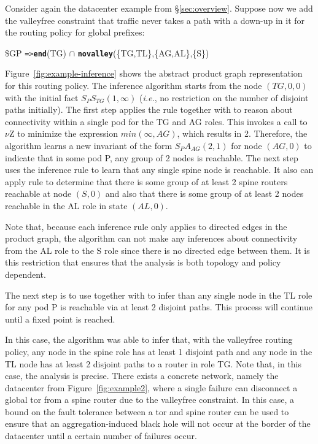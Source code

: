 \documentclass[numbers, 10pt, preprint]{sigplanconf}
\newcommand{\IE}{\emph{i.e.}}
\newcommand{\KW}[1]{\texttt{\small\bfseries{#1}}}
\newcommand{\Path}{\texttt{=>}}
\newcommand{\End}{\KW{end}}
\newcommand{\Novalley}{\KW{novalley}}
\begin{document}
Consider again the datacenter example from \S\ref{sec:overview}. Suppose now we add the valleyfree constraint that traffic never takes a path with a down-up in it for the routing policy for global prefixes:
%
\begin{code}
\$GP \Path \End(TG) \ensuremath{\cap} \Novalley(\{TG,TL\},\{AG,AL\},\{S\})
\end{code}
\noindent
%
Figure~\ref{fig:example-inference} shows the abstract product graph representation for this routing policy. The inference algorithm starts from the node $(TG,0,0)$ with the initial fact $S_P S_{TG}(1,\infty)$ (\IE, no restriction on the number of disjoint paths initially).
%
The first step applies the rule  together with  to reason about connectivity within a single pod for the TG and AG roles. This invokes a call to $\nu$Z to minimize the expression $min(\infty, AG)$, which results in 2. Therefore, the algorithm learns a new invariant of the form $S_P A_{AG} (2,1)$ for node $(AG, 0)$ to indicate that in some pod P, any group of 2 nodes is reachable.
%
The next step uses the inference rule  to learn that any single spine node is reachable. It also can apply rule  to determine that there is some group of at least 2 spine routers reachable at node $(S,0)$ and also that there is some group of at least 2 nodes reachable in the AL role in state $(AL,0)$.

Note that, because each inference rule only applies to directed edges in the product graph, the algorithm can not make any inferences about connectivity from the AL role to the S role since there is no directed edge between them. It is this restriction that ensures that the analysis is both topology and policy dependent.

The next step is to use  together with  to infer than any single node in the TL role for any pod P is reachable via at least 2 disjoint paths. This process will continue until a fixed point is reached.

In this case, the algorithm was able to infer that, with the valleyfree routing policy, any node in the spine role has at least 1 disjoint path and any node in the TL node has at least 2 disjoint paths to a router in role TG. Note that, in this case, the analysis is precise. There exists a concrete network, namely the datacenter from Figure~\ref{fig:example2}, where a single failure can disconnect a global tor from a spine router due to the valleyfree constraint. In this case, a bound on the fault tolerance between a tor and spine router can be used to ensure that an aggregation-induced black hole will not occur at the border of the datacenter until a certain number of failures occur.
\end{document}
